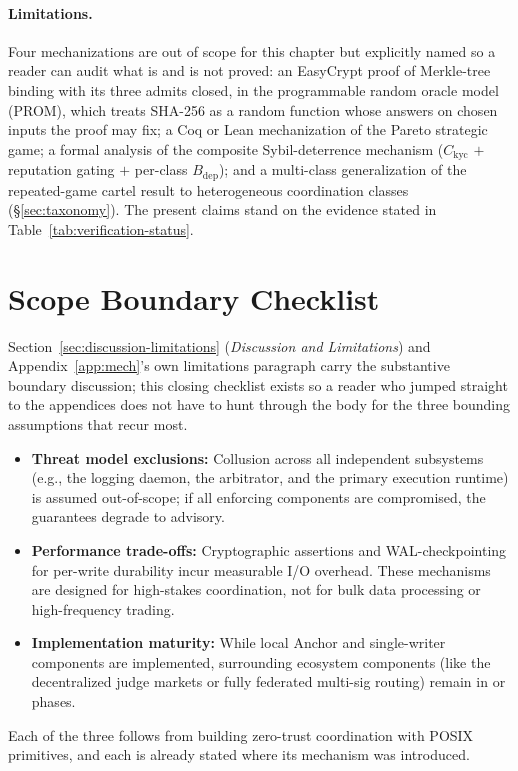 \documentclass[11pt,a4paper]{article}
\theoremstyle{definition}
\theoremstyle{remark}
\begin{document}
\paragraph{Limitations.} Four mechanizations are out of scope for this chapter but explicitly named so a reader can audit what is and is not proved: an EasyCrypt proof of Merkle-tree binding with its three admits closed, in the programmable random oracle model (PROM), which treats SHA-256 as a random function whose answers on chosen inputs the proof may fix; a Coq or Lean mechanization of the Pareto strategic game; a formal analysis of the composite Sybil-deterrence mechanism ($C_{\mathrm{kyc}}$ $+$ reputation gating $+$ per-class $B_{\mathrm{dep}}$); and a multi-class generalization of the repeated-game cartel result to heterogeneous coordination classes (\S\ref{sec:taxonomy}). The present claims stand on the evidence stated in Table~\ref{tab:verification-status}.

\section{Scope Boundary Checklist}\label{sec:bonded-limitations-boundaries}

Section~\ref{sec:discussion-limitations} (\emph{Discussion and Limitations}) and Appendix~\ref{app:mech}'s own limitations paragraph carry the substantive boundary discussion; this closing checklist exists so a reader who jumped straight to the appendices does not have to hunt through the body for the three bounding assumptions that recur most.

\begin{itemize}
    \item \textbf{Threat model exclusions:} Collusion across all independent subsystems (e.g., the logging daemon, the arbitrator, and the primary execution runtime) is assumed out-of-scope; if all enforcing components are compromised, the guarantees degrade to advisory.
    \item \textbf{Performance trade-offs:} Cryptographic assertions and WAL-checkpointing for per-write durability incur measurable I/O overhead. These mechanisms are designed for high-stakes coordination, not for bulk data processing or high-frequency trading.
    \item \textbf{Implementation maturity:} While local Anchor and single-writer components are implemented, surrounding ecosystem components (like the decentralized judge markets or fully federated multi-sig routing) remain in  or  phases.
\end{itemize}

Each of the three follows from building zero-trust coordination with POSIX primitives, and each is already stated where its mechanism was introduced.
\end{document}
